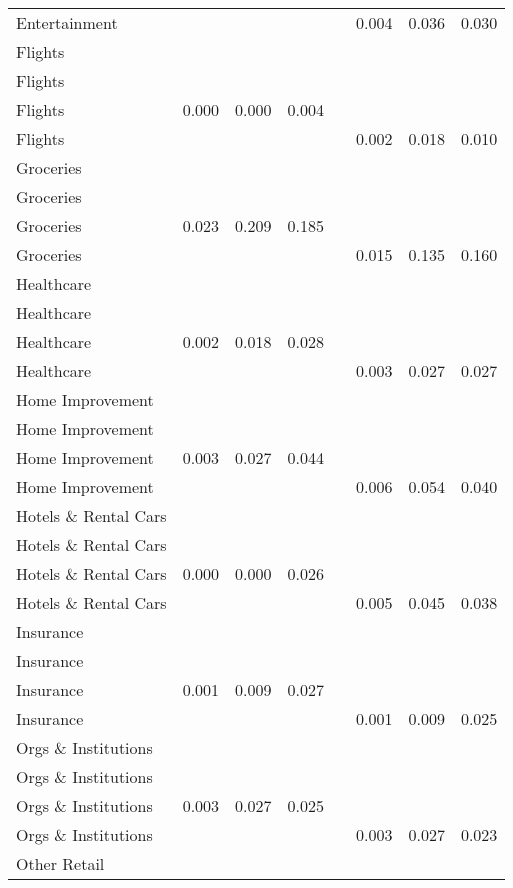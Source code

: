 \begin{table}[ht]
\begin{tabular}{lccccccc}
  Entertainment &  &  &  &  & 0.004 & 0.036 & 0.030 \\ 
  Flights &  &  &  &  &  &  &  \\ 
  Flights &  &  &  &  &  &  &  \\ 
  Flights & 0.000 & 0.000 & 0.004 &  &  &  &  \\ 
  Flights &  &  &  &  & 0.002 & 0.018 & 0.010 \\ 
  Groceries &  &  &  &  &  &  &  \\ 
  Groceries &  &  &  &  &  &  &  \\ 
  Groceries & 0.023 & 0.209 & 0.185 &  &  &  &  \\ 
  Groceries &  &  &  &  & 0.015 & 0.135 & 0.160 \\ 
  Healthcare &  &  &  &  &  &  &  \\ 
  Healthcare &  &  &  &  &  &  &  \\ 
  Healthcare & 0.002 & 0.018 & 0.028 &  &  &  &  \\ 
  Healthcare &  &  &  &  & 0.003 & 0.027 & 0.027 \\ 
  Home Improvement &  &  &  &  &  &  &  \\ 
  Home Improvement &  &  &  &  &  &  &  \\ 
  Home Improvement & 0.003 & 0.027 & 0.044 &  &  &  &  \\ 
  Home Improvement &  &  &  &  & 0.006 & 0.054 & 0.040 \\ 
  Hotels \& Rental Cars &  &  &  &  &  &  &  \\ 
  Hotels \& Rental Cars &  &  &  &  &  &  &  \\ 
  Hotels \& Rental Cars & 0.000 & 0.000 & 0.026 &  &  &  &  \\ 
  Hotels \& Rental Cars &  &  &  &  & 0.005 & 0.045 & 0.038 \\ 
  Insurance &  &  &  &  &  &  &  \\ 
  Insurance &  &  &  &  &  &  &  \\ 
  Insurance & 0.001 & 0.009 & 0.027 &  &  &  &  \\ 
  Insurance &  &  &  &  & 0.001 & 0.009 & 0.025 \\ 
  Orgs \& Institutions &  &  &  &  &  &  &  \\ 
  Orgs \& Institutions &  &  &  &  &  &  &  \\ 
  Orgs \& Institutions & 0.003 & 0.027 & 0.025 &  &  &  &  \\ 
  Orgs \& Institutions &  &  &  &  & 0.003 & 0.027 & 0.023 \\ 
  Other Retail &  &  &  &  &  &  &  \\ 

\end{tabular}
\end{table}
